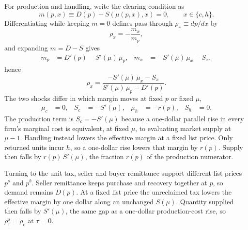 \documentclass[11pt]{article}
\begin{document}
For production and handling, write the clearing condition as
\begin{equation}
  m(p,x)\equiv D(p)-S(\mu(p,x),x)=0,
  \qquad x\in\{c,h\}.
\end{equation}
Differentiating while keeping $m=0$ defines pass-through $\rho_x\equiv dp/dx$ by
\begin{equation}
  \rho_x=-\frac{m_x}{m_p},
  \label{eq:pass-through-general}
\end{equation}
and expanding $m=D-S$ gives
\begin{align}
  m_p &= D'(p)-S'(\mu)\,\mu_p,
  &
  m_x &= -S'(\mu)\,\mu_x-S_x,
\end{align}
hence
\begin{equation}
  \rho_x
  = \frac{-S'(\mu)\,\mu_x-S_x}{S'(\mu)\,\mu_p-D'(p)}.
  \label{eq:pass-through}
\end{equation}
The two shocks differ in which margin moves at fixed $p$ or fixed $\mu$,
\begin{align}
  \mu_c &= 0,
  &
  S_c &= -S'(\mu),
  &
  \mu_h &= -r(p),
  &
  S_h &= 0.
\end{align}
The production term is $S_c=-S'(\mu)$ because a one-dollar parallel rise in
every firm's marginal cost is equivalent, at fixed $\mu$, to evaluating market
supply at $\mu-1$.  Handling instead lowers the effective margin at a fixed
list price.  Only returned units incur $h$, so a one-dollar rise lowers that
margin by $r(p)$.  Supply then falls by $r(p)\,S'(\mu)$, the fraction $r(p)$
of the production numerator.

Turning to the unit tax, seller and buyer remittance support different list
prices $p^{s}$ and $p^{b}$.  Seller remittance keeps purchase and recovery
together at $p$, so demand remains $D(p)$.  At a fixed list price the
unreclaimed tax lowers the effective margin by one dollar along an
unchanged $S(\mu)$.  Quantity supplied then falls by $S'(\mu)$, the same
gap as a one-dollar production-cost rise, so $\rho^{s}_{\tau}=\rho_c$ at
$\tau=0$.
\end{document}
